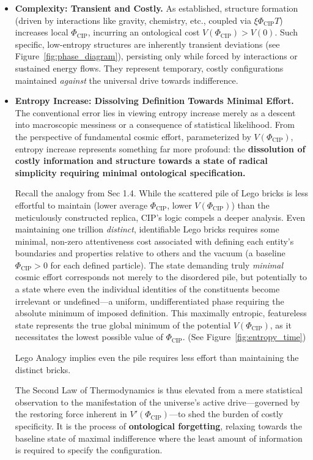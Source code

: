\documentclass[11pt, a4paper]{article}
\newcommand{\subt}[1]{\mathrm{#1}}
\begin{document}
\begin{itemize}
    \item \textbf{Complexity: Transient and Costly.} As established, structure formation (driven by interactions like gravity, chemistry, etc., coupled via $\xi\Phi_{\subt{CIP}}T$) increases local $\Phi_{\subt{CIP}}$, incurring an ontological cost $V(\Phi_{\subt{CIP}}) > V(0)$. Such specific, low-entropy structures are inherently transient deviations (see Figure~\ref{fig:phase_diagram}), persisting only while forced by interactions or sustained energy flows. They represent temporary, costly configurations maintained \textit{against} the universal drive towards indifference.

    \item \textbf{Entropy Increase: Dissolving Definition Towards Minimal Effort.} The conventional error lies in viewing entropy increase merely as a descent into macroscopic messiness or a consequence of statistical likelihood. From the perspective of fundamental cosmic effort, parameterized by $V(\Phi_{\subt{CIP}})$, entropy increase represents something far more profound: the \textbf{dissolution of costly information and structure towards a state of radical simplicity requiring minimal ontological specification.}

    Recall the analogy from Sec 1.4. While the scattered pile of Lego bricks is less effortful to maintain (lower average $\Phi_{\subt{CIP}}$, lower $V(\Phi_{\subt{CIP}})$) than the meticulously constructed replica, CIP's logic compels a deeper analysis. Even maintaining one trillion \textit{distinct}, identifiable Lego bricks requires some minimal, non-zero attentiveness cost associated with defining each entity's boundaries and properties relative to others and the vacuum (a baseline $\Phi_{\subt{CIP}} > 0$ for each defined particle). The state demanding truly \textit{minimal} cosmic effort corresponds not merely to the disordered pile, but potentially to a state where even the individual identities of the constituents become irrelevant or undefined—a uniform, undifferentiated phase requiring the absolute minimum of imposed definition. This maximally entropic, featureless state represents the true global minimum of the potential $V(\Phi_{\subt{CIP}})$, as it necessitates the lowest possible value of $\Phi_{\subt{CIP}}$. (See Figure~\ref{fig:entropy_time})

    Lego Analogy implies even the pile requires less effort than maintaining the distinct bricks.

    The Second Law of Thermodynamics is thus elevated from a mere statistical observation to the manifestation of the universe's active drive—governed by the restoring force inherent in $V'(\Phi_{\subt{CIP}})$—to shed the burden of costly specificity. It is the process of \textbf{ontological forgetting}, relaxing towards the baseline state of maximal indifference where the least amount of information is required to specify the configuration.


\end{itemize}
\end{document}
